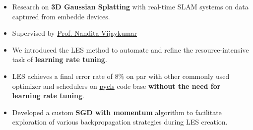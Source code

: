 \documentclass[10pt,a4paper,ragged2e,withhyper]{altacv}
\begin{document}
\begin{paracol}{2}
\begin{itemize}
    \end{itemize}

    \switchcolumn{}

    \begin{itemize}
        \item Research on \textbf{3D Gaussian Splatting} with real-time SLAM systems on data captured from embedde devices.
        \item Supervised by \href{https://www.cs.toronto.edu/~nandita/}{Prof. Nandita Vijaykumar}
    \end{itemize}

        

    \divider{}

    \begin{itemize}

        \item We introduced the LES method to automate and refine the resource-intensive task of \textbf{learning rate tuning}.

        \item LES achieves a final error rate of 8\% on par with other commonly used
              optimizer and schedulers on \href{https://github.com/facebookresearch/pycls}{pycls} code base
              \textbf{without the need for learning rate tuning}.

        \item Developed a custom \textbf{SGD with momentum} algorithm to facilitate exploration of various backpropagation strategies during LES creation.


    \end{itemize}


\end{paracol}
\end{document}
